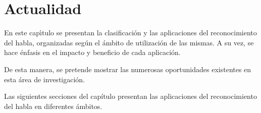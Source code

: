 \chapter{Actualidad}
\label{sec:areas-aplicacion}

En este cap{\'\i}tulo se presentan la clasificaci\'on y las aplicaciones del reconocimiento del habla, organizadas seg\'un el \'ambito
de utilizaci\'on de las mismas. A su vez, se hace \'enfasis en el impacto y beneficio de cada aplicaci\'on.

De esta manera, se pretende mostrar las numerosas oportunidades existentes en esta \'area de investigaci\'on.



Las siguientes secciones del cap\'itulo presentan las aplicaciones del reconocimiento del habla en diferentes \'ambitos.









